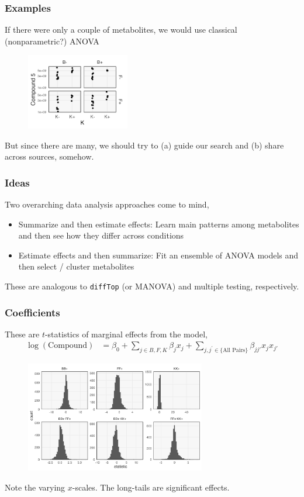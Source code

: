 \documentclass[hyperref={colorlinks=true, linkcolor=violet, citecolor=SeaGreen}]{beamer}
\begin{document}
\begin{frame}
  \frametitle{Examples}
    If there were only a couple of metabolites, we would use classical
    (nonparametric?) ANOVA
  \begin{figure}
    \includegraphics[width=0.4\textwidth]{compound-5}
  \end{figure}

    But since there are many, we should try to (a) guide our search and (b)
    share across sources, somehow.
\end{frame}

\begin{frame}
  \frametitle{Ideas}
  Two overarching data analysis approaches come to mind,
  \begin{itemize}
    \item Summarize and then estimate effects: Learn main patterns among
    metabolites and then see how they differ across conditions
    \item Estimate effects and then summarize: Fit an ensemble of ANOVA models
    and then select / cluster metabolites
  \end{itemize}
  These are analogous to \texttt{diffTop} (or MANOVA) and multiple testing,
  respectively.
\end{frame}

\begin{frame}
  \frametitle{Coefficients}

  These are $t$-statistics of marginal effects from the model,
  \begin{align*}
    \log\left(\text{Compound}\right) &= \beta_0 + \sum_{j \in B, F, K} \beta_{j}x_{j} + \sum_{j, j^\prime \in \{\text{All Pairs}\}} \beta_{jj'}x_{j}x_{j'}
  \end{align*}

  \begin{figure}
    \includegraphics[width=0.7\textwidth]{marginal-coefficients}
  \end{figure}
  Note the varying $x$-scales. The long-tails are significant effects.
\end{frame}
\end{document}
